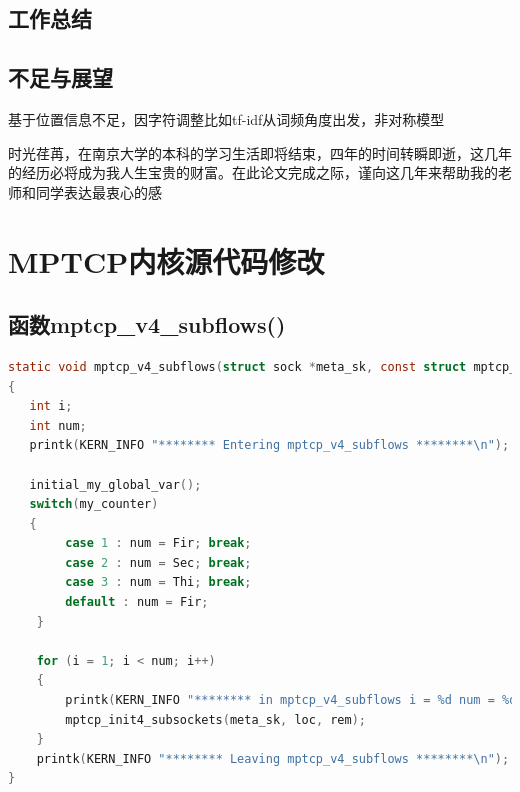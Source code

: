 \documentclass[winfonts,master,oneside,nobackinfo]{njuthesis}
\begin{document}
\section{工作总结}

\section{不足与展望}

基于位置信息不足，因字符调整比如tf-idf从词频角度出发，非对称模型




\begin{acknowledgement}
时光荏苒，在南京大学的本科的学习生活即将结束，四年的时间转瞬即逝，这几年的经历必将成为我人生宝贵的财富。在此论文完成之际，谨向这几年来帮助我的老师和同学表达最衷心的感

\end{acknowledgement}








\appendix
\chapter{MPTCP内核源代码修改}\label{app:1}
\section{函数mptcp\_v4\_subflows()}
\begin{lstlisting}[language=C]
static void mptcp_v4_subflows(struct sock *meta_sk, const struct mptcp_loc4 *loc, struct mptcp_rem4 *rem)
{
   int i;
   int num;
   printk(KERN_INFO "******** Entering mptcp_v4_subflows ********\n");

   initial_my_global_var();
   switch(my_counter)
   {
		case 1 : num = Fir; break;
		case 2 : num = Sec; break;
		case 3 : num = Thi; break;
		default : num = Fir;
	}

	for (i = 1; i < num; i++)
	{
		printk(KERN_INFO "******** in mptcp_v4_subflows i = %d num = %d********\n",i,num);
		mptcp_init4_subsockets(meta_sk, loc, rem);
	}
	printk(KERN_INFO "******** Leaving mptcp_v4_subflows ********\n");
}
\end{lstlisting}
\end{document}
